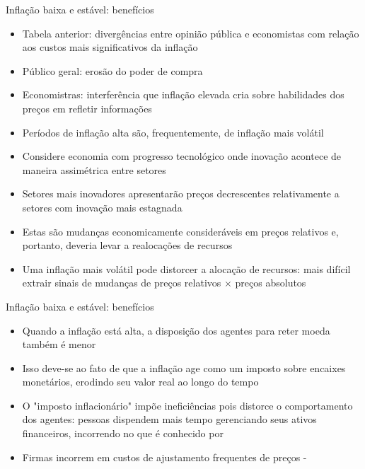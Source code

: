 \documentclass[10pt]{beamer}
\begin{document}
\begin{frame}
    {Inflação baixa e estável: benefícios}
    \begin{itemize}
        \item Tabela anterior: divergências entre opinião pública e economistas com relação aos custos mais significativos da inflação\medskip
        \item Público geral: erosão do poder de compra\medskip
        \item Economistras: interferência que inflação elevada cria sobre habilidades dos preços em refletir informações\medskip
        \item Períodos de inflação alta são, frequentemente, de inflação mais volátil\medskip
        \item Considere economia com progresso tecnológico onde inovação acontece de maneira assimétrica entre setores\medskip
        \item Setores mais inovadores apresentarão preços decrescentes relativamente a setores com inovação mais estagnada\medskip
        \item Estas são mudanças economicamente consideráveis em preços relativos e, portanto, deveria levar a realocações de recursos\medskip
        \item Uma inflação mais volátil pode distorcer a alocação de recursos: mais difícil extrair sinais de mudanças de preços relativos $\times$ preços absolutos
    \end{itemize}
\end{frame}

\begin{frame}
    {Inflação baixa e estável: benefícios}
    \begin{itemize}
        \item Quando a inflação está alta, a disposição dos agentes para reter moeda também é menor\bigskip
        \item Isso deve-se ao fato de que a inflação age como um imposto sobre encaixes monetários, erodindo seu valor real ao longo do tempo\bigskip
        \item O "imposto inflacionário" impõe ineficiências pois distorce o comportamento dos agentes: pessoas dispendem mais tempo gerenciando seus ativos financeiros, incorrendo no que é conhecido por \bigskip
        \item Firmas incorrem em custos de ajustamento frequentes de preços - 
    \end{itemize}
\end{frame}
\end{document}
